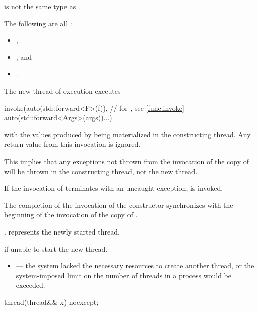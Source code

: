\begin{itemdescr}
\pnum
\constraints
{} is not the same type as .

\pnum
\mandates
The following are all :
\begin{itemize}
\item {},
\item {}, and
\item {}.
\end{itemize}

\pnum
\effects
The new thread of execution executes
\begin{codeblock}
invoke(auto(std::forward<F>(f)),                // for , see \ref{func.invoke}
       auto(std::forward<Args>(args))...)
\end{codeblock}
with the values produced by 
being materialized in the constructing thread.
Any return value from this invocation is ignored.
\begin{note}
This implies that any exceptions not thrown from the invocation of the copy
of  will be thrown in the constructing thread, not the new thread.
\end{note}
If the invocation of  terminates with an uncaught exception,
 is invoked.

\pnum
\sync
The completion of the invocation of the constructor
synchronizes with the beginning of the invocation of the copy of .

\pnum
\ensures
{}.  represents the newly started thread.

\pnum
\throws
{} if unable to start the new thread.

\pnum
\errors
\begin{itemize}
\item {} --- the system lacked the necessary
resources to create another thread, or the system-imposed limit on the number of
threads in a process would be exceeded.
\end{itemize}
\end{itemdescr}

%
\begin{itemdecl}
thread(thread&& x) noexcept;
\end{itemdecl}

